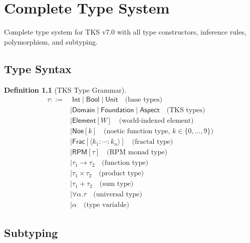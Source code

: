 \documentclass[11pt,twoside,openright]{book}
\theoremstyle{definition}
\newtheorem{definition}{Definition}[chapter]
\theoremstyle{plain}
\theoremstyle{remark}
\newcommand{\vexp}{\textcolor{green!50!black}{\textbf{[EXPANDED v7.0]}}}
\begin{document}
\chapter{Complete Type System}
\label{ch:complete-types}

\begin{tcolorbox}[colback=green!5!white,colframe=green!75!black,title=\vexp]
Complete type system for TKS v7.0 with all type constructors, inference rules, polymorphism, and subtyping.
\end{tcolorbox}

\section{Type Syntax}

\begin{definition}[TKS Type Grammar]
\label{def:type-grammar}
\begin{align}
\tau ::=&\; \mathsf{Int} \mid \mathsf{Bool} \mid \mathsf{Unit} \quad \text{(base types)} \\
    &\mid \mathsf{Domain} \mid \mathsf{Foundation} \mid \mathsf{Aspect} \quad \text{(TKS types)} \\
    &\mid \mathsf{Element}[W] \quad \text{(world-indexed element)} \\
    &\mid \mathsf{Noe}[k] \quad \text{(noetic function type, } k \in \{0,\ldots,9\}) \\
    &\mid \mathsf{Frac}[\langle k_1:\cdots:k_n \rangle] \quad \text{(fractal type)} \\
    &\mid \mathsf{RPM}[\tau] \quad \text{(RPM monad type)} \\
    &\mid \tau_1 \to \tau_2 \quad \text{(function type)} \\
    &\mid \tau_1 \times \tau_2 \quad \text{(product type)} \\
    &\mid \tau_1 + \tau_2 \quad \text{(sum type)} \\
    &\mid \forall \alpha. \tau \quad \text{(universal type)} \\
    &\mid \alpha \quad \text{(type variable)}
\end{align}
\end{definition}

\section{Subtyping}
\end{document}
